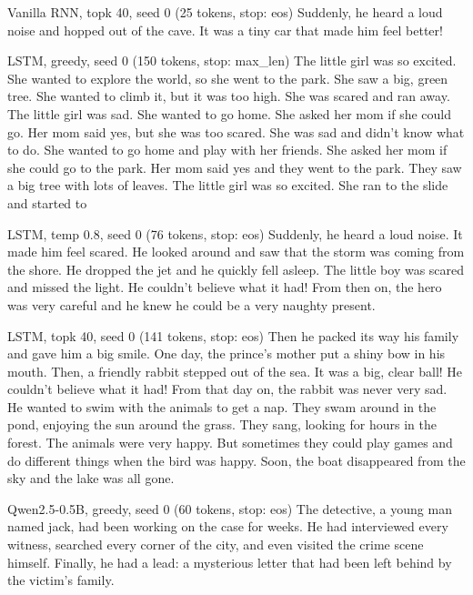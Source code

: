 \begin{modelout}{Vanilla RNN, topk 40, seed 0 (25 tokens, stop: eos)}
\small Suddenly, he heard a loud noise and hopped out of the cave. It was a tiny car that made him feel better!
\end{modelout}

\begin{modelout}{LSTM, greedy, seed 0 (150 tokens, stop: max\_len)}
\small The little girl was so excited. She wanted to explore the world, so she went to the park. She saw a big, green tree. She wanted to climb it, but it was too high. She was scared and ran away. The little girl was sad. She wanted to go home. She asked her mom if she could go. Her mom said yes, but she was too scared. She was sad and didn't know what to do. She wanted to go home and play with her friends. She asked her mom if she could go to the park. Her mom said yes and they went to the park. They saw a big tree with lots of leaves. The little girl was so excited. She ran to the slide and started to
\end{modelout}

\begin{modelout}{LSTM, temp 0.8, seed 0 (76 tokens, stop: eos)}
\small Suddenly, he heard a loud noise. It made him feel scared. He looked around and saw that the storm was coming from the shore. He dropped the jet and he quickly fell asleep. The little boy was scared and missed the light. He couldn't believe what it had! From then on, the hero was very careful and he knew he could be a very naughty present.
\end{modelout}

\begin{modelout}{LSTM, topk 40, seed 0 (141 tokens, stop: eos)}
\small Then he packed its way his family and gave him a big smile. One day, the prince's mother put a shiny bow in his mouth. Then, a friendly rabbit stepped out of the sea. It was a big, clear ball! He couldn't believe what it had! From that day on, the rabbit was never very sad. He wanted to swim with the animals to get a nap. They swam around in the pond, enjoying the sun around the grass. They sang, looking for hours in the forest. The animals were very happy. But sometimes they could play games and do different things when the bird was happy. Soon, the boat disappeared from the sky and the lake was all gone.
\end{modelout}

\begin{modelout}{Qwen2.5-0.5B, greedy, seed 0 (60 tokens, stop: eos)}
\small The detective, a young man named jack, had been working on the case for weeks. He had interviewed every witness, searched every corner of the city, and even visited the crime scene himself. Finally, he had a lead: a mysterious letter that had been left behind by the victim's family.
\end{modelout}


